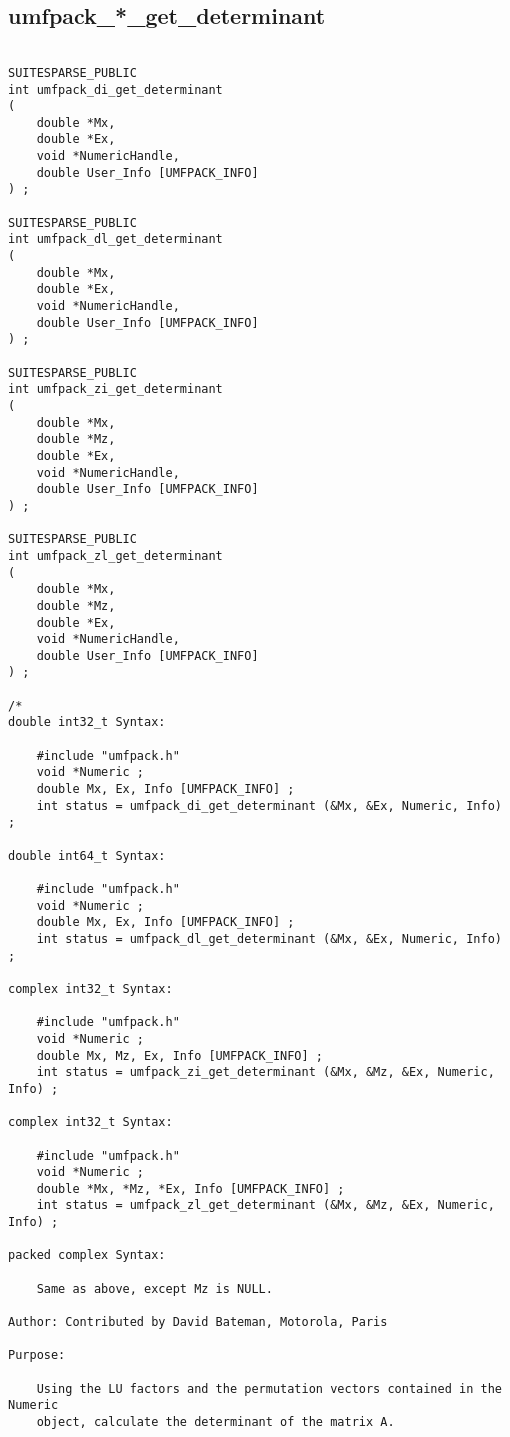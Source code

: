 \documentclass[11pt]{article}
\begin{document}
\newpage
\subsection{umfpack\_*\_get\_determinant}

{\footnotesize
\begin{verbatim}

SUITESPARSE_PUBLIC
int umfpack_di_get_determinant
(
    double *Mx,
    double *Ex,
    void *NumericHandle,
    double User_Info [UMFPACK_INFO]
) ;

SUITESPARSE_PUBLIC
int umfpack_dl_get_determinant
(
    double *Mx,
    double *Ex,
    void *NumericHandle,
    double User_Info [UMFPACK_INFO]
) ;

SUITESPARSE_PUBLIC
int umfpack_zi_get_determinant
(
    double *Mx,
    double *Mz,
    double *Ex,
    void *NumericHandle,
    double User_Info [UMFPACK_INFO]
) ;

SUITESPARSE_PUBLIC
int umfpack_zl_get_determinant
(
    double *Mx,
    double *Mz,
    double *Ex,
    void *NumericHandle,
    double User_Info [UMFPACK_INFO]
) ;

/*
double int32_t Syntax:

    #include "umfpack.h"
    void *Numeric ;
    double Mx, Ex, Info [UMFPACK_INFO] ;
    int status = umfpack_di_get_determinant (&Mx, &Ex, Numeric, Info) ;

double int64_t Syntax:

    #include "umfpack.h"
    void *Numeric ;
    double Mx, Ex, Info [UMFPACK_INFO] ;
    int status = umfpack_dl_get_determinant (&Mx, &Ex, Numeric, Info) ;

complex int32_t Syntax:

    #include "umfpack.h"
    void *Numeric ;
    double Mx, Mz, Ex, Info [UMFPACK_INFO] ;
    int status = umfpack_zi_get_determinant (&Mx, &Mz, &Ex, Numeric, Info) ;

complex int32_t Syntax:

    #include "umfpack.h"
    void *Numeric ;
    double *Mx, *Mz, *Ex, Info [UMFPACK_INFO] ;
    int status = umfpack_zl_get_determinant (&Mx, &Mz, &Ex, Numeric, Info) ;

packed complex Syntax:

    Same as above, except Mz is NULL.

Author: Contributed by David Bateman, Motorola, Paris

Purpose:

    Using the LU factors and the permutation vectors contained in the Numeric
    object, calculate the determinant of the matrix A.


\end{verbatim}}
\end{document}
